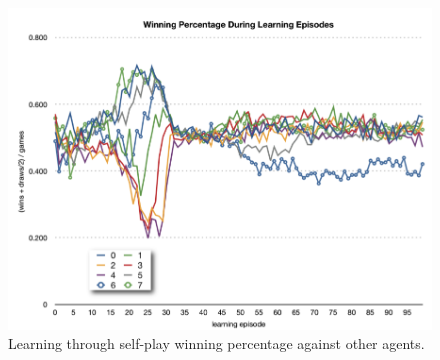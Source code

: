 \begin{figure}[hbtp]
\center
\includegraphics[scale=0.5]{fig12}
\caption{Learning through self-play winning percentage against other agents.}
\label{fig:sp_learning1}
\end{figure}

